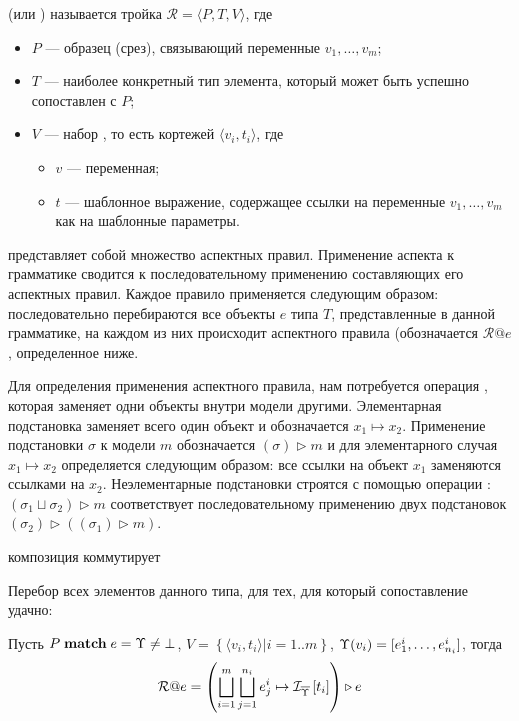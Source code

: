\begin{Def}
 (или ) называется тройка
$\mathcal{R} = \langle P, T, V \rangle$, где
\begin{itemize}
\item $P$ --- образец (срез), связывающий переменные $v_1,\ldots,v_m$;
\item $T$ --- наиболее конкретный тип элемента, который может быть успешно сопоставлен с $P$;
\item $V$ --- набор , то есть кортежей $\langle v_i, t_i \rangle$, где
	\begin{itemize}
		\item $v$ --- переменная;
		\item $t$ --- шаблонное выражение, содержащее ссылки на переменные $v_1,\ldots,v_m$ как на шаблонные параметры.
	\end{itemize}
\end{itemize}
\end{Def}
\newcommand{\rapply}[2]{#1@#2}
 представляет собой множество аспектных правил. Применение аспекта к грамматике сводится к последовательному применению составляющих его аспектных правил. Каждое правило применяется следующим образом: последовательно перебираются все объекты $e$ типа $T$, представленные в данной грамматике, на каждом из них происходит  аспектного правила (обозначается $\rapply{\mathcal{R}}{e}$, определенное ниже.

\newcommand{\subst}[2]{ #1 \mapsto #2 }
\newcommand{\apply}[2]{\left( #1 \right) \triangleright #2}
Для определения применения аспектного правила, нам потребуется операция , которая заменяет одни объекты внутри модели другими. Элементарная подстановка заменяет всего один объект и обозначается $\subst{x_1}{x_2}$. Применение подстановки $\sigma$ к модели $m$ обозначается $\apply{\sigma}{m}$ и для элементарного случая $\subst{x_1}{x_2}$ определяется следующим образом: все ссылки на объект $x_1$ заменяются ссылками на $x_2$.
Неэлементарные подстановки строятся с помощью операции : $\apply{\sigma_1 \sqcup \sigma_2}{m}$ соответствует последовательному применению двух подстановок $\apply{\sigma_2}{\left( \apply{\sigma_1}{m} \right)}$.

композиция коммутирует

Перебор всех элементов данного типа, для тех, для который сопоставление удачно:

Пусть $P \; \mathbf{match} \; e = \Upsilon \neq \bot$, $V = \left\{\langle v_i, t_i \rangle | i = 1..m \right\}$,  $\Upsilon(v_i) = [e^i_1, \ldots, e^i_{n_i}]$, тогда
	$$\mathcal{R}@e
		= \apply{\bigsqcup\limits_{i=1}^{m} \bigsqcup\limits_{j=1}^{n_i}
			\subst{e^i_j}{\Inst{\meflatten{\ME}}{t_i}}}{e}$$

